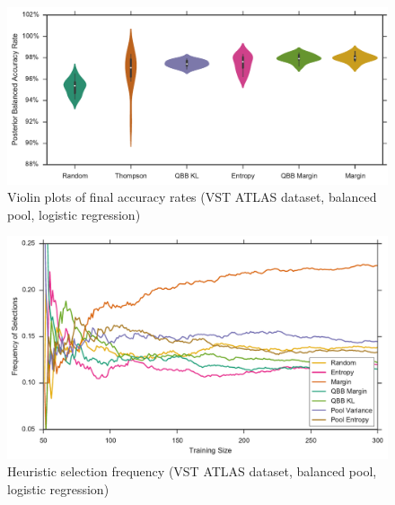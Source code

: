 \begin{figure}[p]
	\centering
	\includegraphics[width=\textwidth]{figures/5_active/vstatlas_bl_ind_violin}
	\caption[Violin plots of final accuracy rates (VST ATLAS, balanced, logistic)]{
		Violin plots of final accuracy rates (VST ATLAS dataset, balanced pool, logistic regression)}
	\label{fig:vstatlas_bl_ind_violin}
\end{figure}

\begin{figure}[p]
	\centering
	\includegraphics[width=\textwidth]{figures/5_thompson/vstatlas_bl_frequencies}
	\caption[Heuristic selection frequency (VST ATLAS, balanced, logistic)]{
		Heuristic selection frequency (VST ATLAS dataset, balanced pool, logistic regression)}
	\label{fig:vstatlas_bl_frequencies}
\end{figure}

